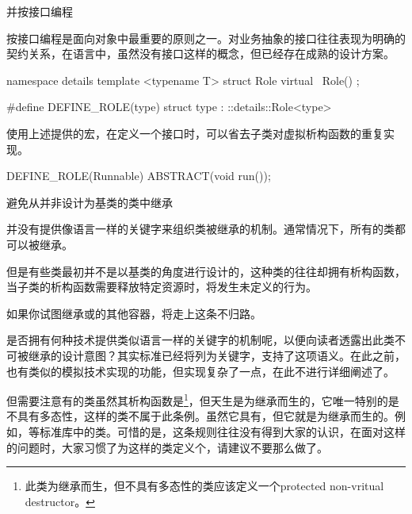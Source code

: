 \begin{content}

\begin{regulation}
并按接口编程
\end{regulation}

按接口编程是面向对象中最重要的原则之一。对业务抽象的接口往往表现为明确的契约关系，在\cpp{}语言中，虽然没有接口这样的概念，但已经存在成熟的设计方案。

\begin{leftbar}
\begin{c++}
namespace details
{
   template <typename T>
   struct Role
   {
      virtual ~Role() {}
   };
}

#define DEFINE_ROLE(type) struct type : ::details::Role<type>
\end{c++}
\end{leftbar}

使用上述提供的宏，在定义一个接口时，可以省去子类对虚拟析构函数的重复实现。

\begin{leftbar}
\begin{c++}
DEFINE_ROLE(Runnable)
{
    ABSTRACT(void run());
}
\end{c++}
\end{leftbar}

\begin{regulation}
避免从并非设计为基类的类中继承
\end{regulation}

并没有提供像语言一样的关键字来组织类被继承的机制。通常情况下，所有的类都可以被继承。

但是有些类最初并不是以基类的角度进行设计的，这种类的往往却拥有析构函数，当子类的析构函数需要释放特定资源时，将发生未定义的行为。

如果你试图继承或的其他容器，将走上这条不归路。

是否拥有何种技术提供类似语言一样的关键字的机制呢，以便向读者透露出此类不可被继承的设计意图？其实标准已经将列为关键字，支持了这项语义。在此之前，也有类似的模拟技术实现的功能，但实现复杂了一点，在此不进行详细阐述了。

但需要注意有的类虽然其析构函数是\footnote{此类为继承而生，但不具有多态性的类应该定义一个protected non-vritual destructor。}，但天生是为继承而生的，它唯一特别的是不具有多态性，这样的类不属于此条例。虽然它具有，但它就是为继承而生的。例如，等标准库中的类。可惜的是，这条规则往往没有得到大家的认识，在面对这样的问题时，大家习惯了为这样的类定义个，请建议不要那么做了。


\end{content}
